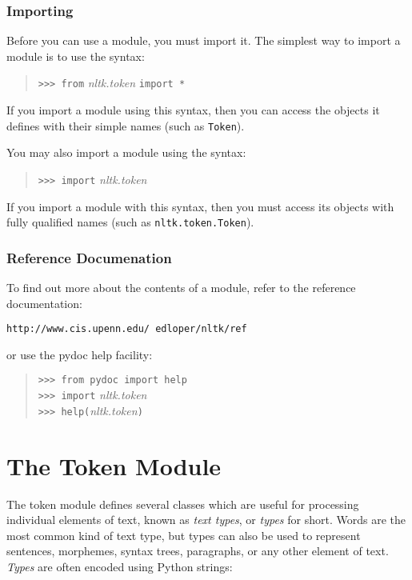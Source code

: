\documentclass[11pt]{article}
\begin{document}
\subsubsection{Importing}

  Before you can use a module, you must import it.  The simplest way
  to import a module is to use the syntax:

  \begin{quote}
  \texttt{>>> from} \textit{nltk.token} \texttt{import *}
  \end{quote}

  \noindent If you import a module using this syntax, then you can
  access the objects it defines with their simple names (such as
  \texttt{Token}).

  You may also import a module using the syntax:

  \begin{quote}
  \texttt{>>> import} \textit{nltk.token}
  \end{quote}

  \noindent If you import a module with this syntax, then you must
  access its objects with fully qualified names (such as
  \texttt{nltk.token.Token}).

\subsubsection{Reference Documenation}

  To find out more about the contents of a module, refer to the
  reference documentation:

  \texttt{http://www.cis.upenn.edu/~edloper/nltk/ref}

  \noindent or use the pydoc help facility:

  \begin{quote}
  \texttt{>>> from pydoc import help}\\
  \texttt{>>> import} \textit{nltk.token}\\
  \texttt{>>> help(}\textit{nltk.token}\texttt{)}
  \end{quote}

\section{The Token Module}

  The token module defines several classes which are useful for
  processing individual elements of text, known as \emph{text types},
  or \emph{types} for short.  Words are the most common kind of text
  type, but types can also be used to represent sentences, morphemes,
  syntax trees, paragraphs, or any other element of text.
  \emph{Types} are often encoded using Python strings:
\end{document}
